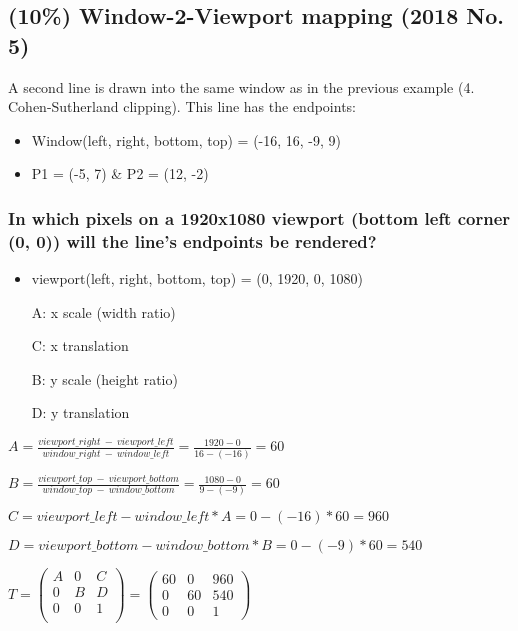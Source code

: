 \subsection{(10\%) Window-2-Viewport mapping (2018 No. 5)}
A second line is drawn into the same window as in the previous example (4. Cohen-Sutherland clipping).  This line has the endpoints: 

\begin{itemize}
    \item Window(left, right, bottom, top) = (-16, 16, -9, 9)
    \item P1 = (-5, 7) \& P2 = (12, -2) 
\end{itemize}

\subsubsection{In which pixels on a 1920x1080 viewport (bottom left corner (0, 0)) will the line's endpoints be rendered? }

\begin{itemize}
    \item viewport(left, right, bottom, top) = (0, 1920, 0, 1080)
\end{itemize}

\begin{itemize}
    \item[A:] x scale (width ratio)
    \item[C:] x translation 
    \item[B:] y scale (height ratio)
    \item[D:] y translation 
\end{itemize}

$
    A 
=
    \frac{viewport\_right \:-\: viewport\_left}{window\_right \:-\: window\_left}
=
    \frac{1920 - 0}{16 - (-16)}
=
    60
$

$
    B
=
    \frac{viewport\_top \:-\: viewport\_bottom}{window\_top \:-\: window\_bottom}
=
    \frac{1080 - 0}{9 - (-9)}
=
    60
$

$
    C
=
    viewport\_left - window\_left * A
=
    0 - (-16) * 60
=
    960
$

$
    D
=
    viewport\_bottom - window\_bottom * B
=
    0 - (-9) * 60
=
    540
$

$
    T
=
    \left(\begin{array}{ccc}
        A & 0 & C\\
        0 & B & D\\
        0 & 0 & 1\\
    \end{array}\right)
=
    \left(\begin{array}{ccc}
        60 &  0 & 960 \\
        0  & 60 & 540 \\
        0  &  0 &    1
    \end{array}\right)
$

